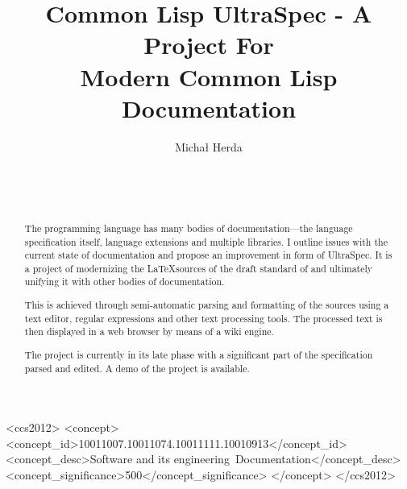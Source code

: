 \documentclass{sig-alternate-05-2015}
\def\inputtex#1{}
\begin{document}
\title{Common Lisp UltraSpec - A Project For \\ Modern Common Lisp Documentation}
\author{\alignauthor
Michał Herda\\
\\
\\
\\
}


\maketitle

\begin{abstract}
The \cl{} programming language has many bodies of documentation---the language specification \cite{ANSI:1994:standard} itself, language extensions and multiple libraries. I outline issues with the current state of \cl{} documentation and propose an improvement in form of \cl{} UltraSpec. It is a project of modernizing the \LaTeX sources of the draft standard \cite{ANSI:1994:draft} of \cl{} and ultimately unifying it with other bodies of \cl{} documentation.

This is achieved through semi-automatic parsing and formatting of the sources using a text editor, regular expressions and other text processing tools. The processed text is then displayed in a web browser by means of a wiki engine.

The project is currently in its late phase with a significant part of the specification parsed and edited. A demo of the project is available.
\end{abstract}

\begin{CCSXML}
<ccs2012>
<concept>
<concept_id>10011007.10011074.10011111.10010913</concept_id>
<concept_desc>Software and its engineering~Documentation</concept_desc>
<concept_significance>500</concept_significance>
</concept>
</ccs2012>
\end{CCSXML}


\printccsdesc


\inputtex{sec-introduction.tex}
\inputtex{sec-previous-work.tex}
\inputtex{sec-my-work.tex}
\inputtex{sec-conclusions-and-future-work.tex}



\end{document}
